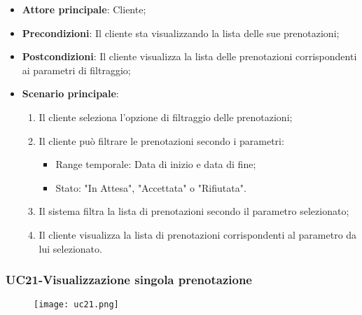 \begin{itemize}
\item \textbf{Attore principale}: Cliente;
\item \textbf{Precondizioni}: Il cliente sta visualizzando la lista delle sue prenotazioni;
\item \textbf{Postcondizioni}: Il cliente visualizza la lista delle prenotazioni corrispondenti ai parametri di filtraggio;
\item \textbf{Scenario principale}:
\begin{enumerate}
\item Il cliente seleziona l'opzione di filtraggio delle prenotazioni;
\item Il cliente può filtrare le prenotazioni secondo i parametri:
\begin{itemize}
\item Range temporale: Data di inizio e data di fine;
\item Stato: "In Attesa", "Accettata" o "Rifiutata".
\end{itemize}
\item Il sistema filtra la lista di prenotazioni secondo il parametro selezionato;
\item Il cliente visualizza la lista di prenotazioni corrispondenti al parametro da lui selezionato.
\end{enumerate}
\end{itemize}

\subsubsection{UC21-Visualizzazione singola prenotazione}
\begin{figure}[h] \texttt{[image: uc21.png]} \end{figure}

